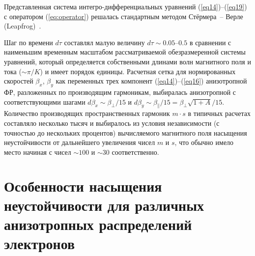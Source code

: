 Представленная система интегро-дифференциальных уравнений (\ref{eq14})--(\ref{eq19}) с оператором (\ref{eq:operator}) решалась стандартным методом Стёрмера~-- Верле (Leapfrog)~\cite{Birdsall2018}. 

Шаг по времени $d\tau$ составлял малую величину $d\tau\sim 0.05$--$0.5$ в сравнении с наименьшим временным масштабом рассматриваемой обезразмеренной системы уравнений, который определяется собственными длинами волн магнитного поля и тока ($\sim \! {\pi}/{K}$) и имеет порядок единицы. Расчетная сетка для нормированных скоростей $\beta_x$, $\beta_y$ как переменных трех компонент (\ref{eq14})--(\ref{eq16})  анизотропной ФР, разложенных по производящим гармоникам, выбиралась анизотропной с соответствующими шагами $d\beta_x\sim{\beta_{\perp}}/{15}$ и $d\beta_y\sim{\beta_{\|}}/{15}={\beta_{\perp}\sqrt{1+A}}/{15}$. Количество производящих пространственных гармоник $m\cdot s$ в типичных расчетах составляло несколько тысяч и выбиралось из условия независимости (с точностью до нескольких процентов) вычисляемого магнитного поля насыщения неустойчивости от дальнейшего увеличения чисел $m$ и $s$, что обычно имело место начиная с чисел $\sim\! 100$ и $\sim\! 30$ соответственно. 



\section{Особенности насыщения неустойчивости для различных анизотропных распределений электронов}

